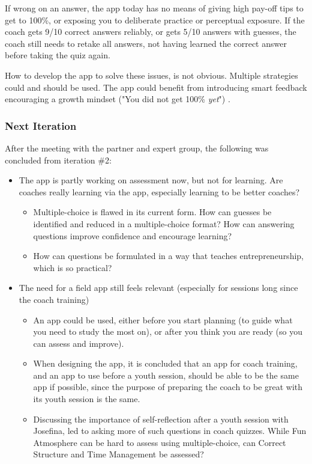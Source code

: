 If wrong on an answer, the app today has no means of giving high pay-off tips to get to 100\%, or exposing you to deliberate practice or perceptual exposure. If the coach gets 9/10 correct answers reliably, or gets 5/10 answers with guesses, the coach still needs to retake all answers, not having learned the correct answer before taking the quiz again.

How to develop the app to solve these issues, is not obvious. Multiple strategies could and should be used. The app could benefit from introducing smart feedback encouraging a growth mindset ("You did not get 100\% \textit{yet}") \citep{dweck}.

\subsubsection{Next Iteration}
After the meeting with the partner and expert group, the following was concluded from iteration \#2:

\begin{itemize}
\item The app is partly working on assessment now, but not for learning. Are coaches really learning via the app, especially learning to be better coaches?
  \begin{itemize}
    \item Multiple-choice is flawed in its current form. How can guesses be identified and reduced in a multiple-choice format? How can answering questions improve confidence and encourage learning?
    \item How can questions be formulated in a way that teaches entrepreneurship, which is so practical?
  \end{itemize}
\item The need for a field app still feels relevant (especially for sessions long since the coach training)
  \begin{itemize}
    \item An app could be used, either before you start planning (to guide what you need to study the most on), or after you think you are ready (so you can assess and improve).
    \item When designing the app, it is concluded that an app for coach training, and an app to use before a youth session, should be able to be the same app if possible, since the purpose of preparing the coach to be great with its youth session is the same.
    \item Discussing the importance of self-reflection after a youth session with Josefina, led to asking more of such questions in coach quizzes. While Fun Atmosphere can be hard to assess using multiple-choice, can Correct Structure and Time Management be assessed?
  \end{itemize}
\end{itemize}

